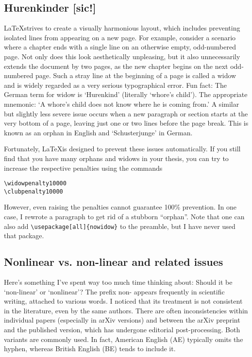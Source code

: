 \subsection{Hurenkinder [sic!]}

\LaTeX strives to create a visually harmonious layout, which includes preventing isolated lines from appearing on a new page. For example, consider a scenario where a chapter ends with a single line on an otherwise empty, odd-numbered page. Not only does this look aesthetically unpleasing, but it also unnecessarily extends the document by two pages, as the new chapter begins on the next odd-numbered page. 
Such a stray line at the beginning of a page is called a widow
and is widely regarded as a very serious typographical error.
Fun fact: The German term for widow is `Hurenkind' (literally `whore's child'). The appropriate mnemonic: `A whore's child does not know where he is coming from.'
A similar but slightly less severe issue occurs when a new paragraph or section starts at the very bottom of a page, leaving just one or two lines before the page break. This is known as an orphan in English and `Schusterjunge' in German.

Fortunately, \LaTeX is designed to prevent these issues automatically.
If you still find that you have many orphans and widows in your thesis, you can try to increase the respective penalties using the commands
\begin{lstlisting}
\widowpenalty10000
\clubpenalty10000
\end{lstlisting}
However, even raising the penalties cannot guarantee 100\% prevention. In one case, I rewrote a paragraph to get rid of a stubborn ``orphan''.
Note that one can also add \verb|\usepackage[all]{nowidow}| to the preamble, but I have never used that package.

\subsection{Nonlinear vs. non-linear and related issues}
Here’s something I've spent way too much time thinking about: Should it be `non-linear' or `nonlinear'?
The prefix non- appears frequently in scientific writing, attached to various words. I noticed that its treatment is not consistent in the literature, even by the same authors. There are often inconsistencies within individual papers (especially in arXiv versions) and between the arXiv preprint and the published version, which has undergone editorial post-processing.
Both variants are commonly used. In fact, American English (AE) typically omits the hyphen, whereas British English (BE) tends to include it.

